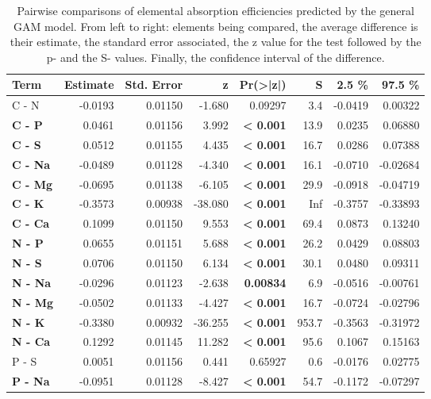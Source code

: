 \begin{table}[H]
\centering
\caption{\label{tab:table_pairs_i_ae}Pairwise comparisons of elemental absorption efficiencies predicted by the general GAM model. From left to right: elements being compared, the average difference is their estimate, the standard error associated, the z value for the test followed by the p- and the S- values. Finally, the confidence interval of the difference.}
\centering
\begin{tabular}[t]{>{}lrrr>{}rrrr}
\toprule
\textbf{Term} & \textbf{Estimate} & \textbf{Std. Error} & \textbf{z} & \textbf{Pr(>|z|)} & \textbf{S} & \textbf{2.5 \%} & \textbf{97.5 \%}\\
\midrule
C - N & -0.0193 & 0.01150 & -1.680 & 0.09297 & 3.4 & -0.0419 & 0.00322\\
\textbf{C - P} & 0.0461 & 0.01156 & 3.992 & \textbf{< 0.001} & 13.9 & 0.0235 & 0.06880\\
\textbf{C - S} & 0.0512 & 0.01155 & 4.435 & \textbf{< 0.001} & 16.7 & 0.0286 & 0.07388\\
\textbf{C - Na} & -0.0489 & 0.01128 & -4.340 & \textbf{< 0.001} & 16.1 & -0.0710 & -0.02684\\
\textbf{C - Mg} & -0.0695 & 0.01138 & -6.105 & \textbf{< 0.001} & 29.9 & -0.0918 & -0.04719\\
\textbf{C - K} & -0.3573 & 0.00938 & -38.080 & \textbf{< 0.001} & Inf & -0.3757 & -0.33893\\
\textbf{C - Ca} & 0.1099 & 0.01150 & 9.553 & \textbf{< 0.001} & 69.4 & 0.0873 & 0.13240\\
\textbf{N - P} & 0.0655 & 0.01151 & 5.688 & \textbf{< 0.001} & 26.2 & 0.0429 & 0.08803\\
\textbf{N - S} & 0.0706 & 0.01150 & 6.134 & \textbf{< 0.001} & 30.1 & 0.0480 & 0.09311\\
\textbf{N - Na} & -0.0296 & 0.01123 & -2.638 & \textbf{0.00834} & 6.9 & -0.0516 & -0.00761\\
\textbf{N - Mg} & -0.0502 & 0.01133 & -4.427 & \textbf{< 0.001} & 16.7 & -0.0724 & -0.02796\\
\textbf{N - K} & -0.3380 & 0.00932 & -36.255 & \textbf{< 0.001} & 953.7 & -0.3563 & -0.31972\\
\textbf{N - Ca} & 0.1292 & 0.01145 & 11.282 & \textbf{< 0.001} & 95.6 & 0.1067 & 0.15163\\
P - S & 0.0051 & 0.01156 & 0.441 & 0.65927 & 0.6 & -0.0176 & 0.02775\\
\textbf{P - Na} & -0.0951 & 0.01128 & -8.427 & \textbf{< 0.001} & 54.7 & -0.1172 & -0.07297\\

\end{tabular}
\end{table}
